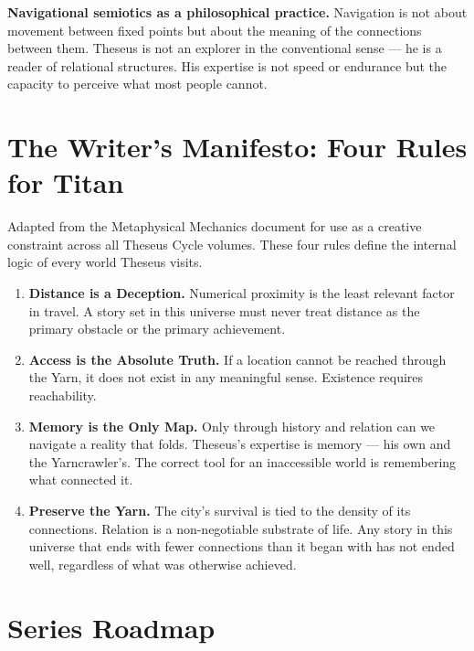 \documentclass[11pt]{article}
\begin{document}
\textbf{Navigational semiotics as a philosophical practice.} Navigation is not about movement between fixed points but about the meaning of the connections between them. Theseus is not an explorer in the conventional sense --- he is a reader of relational structures. His expertise is not speed or endurance but the capacity to perceive what most people cannot.

\section{The Writer's Manifesto: Four Rules for Titan}

Adapted from the Metaphysical Mechanics document for use as a creative constraint across all Theseus Cycle volumes. These four rules define the internal logic of every world Theseus visits.

\begin{enumerate}[leftmargin=1.5em]
\item \textbf{Distance is a Deception.} Numerical proximity is the least relevant factor in travel. A story set in this universe must never treat distance as the primary obstacle or the primary achievement.

\item \textbf{Access is the Absolute Truth.} If a location cannot be reached through the Yarn, it does not exist in any meaningful sense. Existence requires reachability.

\item \textbf{Memory is the Only Map.} Only through history and relation can we navigate a reality that folds. Theseus's expertise is memory --- his own and the Yarncrawler's. The correct tool for an inaccessible world is remembering what connected it.

\item \textbf{Preserve the Yarn.} The city's survival is tied to the density of its connections. Relation is a non-negotiable substrate of life. Any story in this universe that ends with fewer connections than it began with has not ended well, regardless of what was otherwise achieved.
\end{enumerate}

\section{Series Roadmap}
\end{document}

